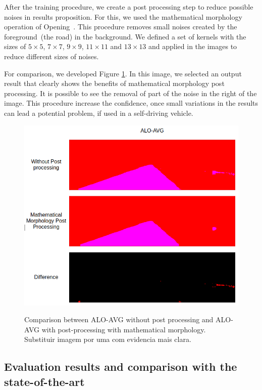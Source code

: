 After the training procedure, we create a post processing step to reduce possible noises in results proposition. For this, we used the mathematical morphology operation of Opening~\cite{najman13}. This procedure removes small noises created by the foreground~(the road) in the background. We defined a set of kernels with the sizes of $5\times5$, $7\times7$, $9\times9$, $11\times11$ and $13\times13$ and applied in the images to reduce different sizes of noises. 

For comparison, we developed Figure \ref{fig:post_processing_comp}. In this image, we selected an output result that clearly shows the benefits of mathematical morphology post processing. {\color{red}It is possible to see the removal of part of the noise in the right of the image.} This procedure increase the confidence, once small variations in the results can lead a potential problem, if used in a self-driving vehicle.

\begin{figure}
  \caption{Comparison between ALO-AVG without post processing and ALO-AVG with post-processing with mathematical morphology. {\color{red}Substituir imagem por uma com evidencia mais clara.}}
  \centering
  \includegraphics[width=0.9\columnwidth]{figures/falreis/post_processing_comparison.png}
  \label{fig:post_processing_comp}
\end{figure}

\subsection{Evaluation results and comparison with the state-of-the-art}

